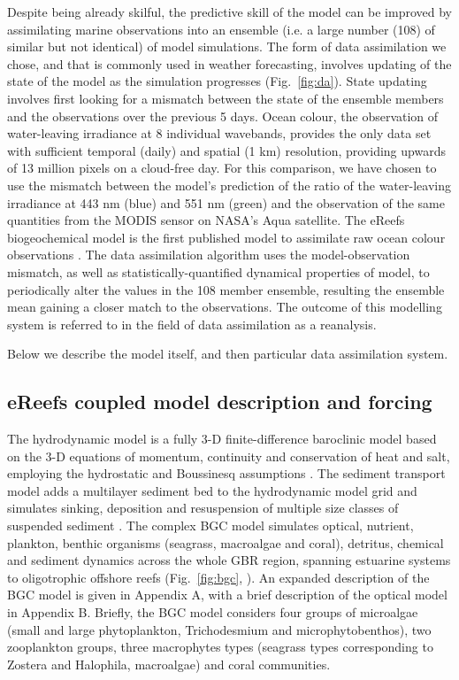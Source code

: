 \documentclass{elsart}
\begin{document}
Despite being already skilful, the predictive skill of the model can be improved by assimilating marine observations into an ensemble (i.e. a large number (108) of similar but not identical) of model simulations. The form of data assimilation we chose, and that is commonly used in weather forecasting, involves updating of the state of the model as the simulation progresses (Fig.~\ref{fig:da}). State updating involves first looking for a mismatch between the state of the ensemble members and the observations over the previous 5 days. Ocean colour, the observation of water-leaving irradiance at 8 individual wavebands, provides the only data set with sufficient temporal (daily) and spatial (1 km) resolution, providing upwards of 13 million pixels on a cloud-free day. For this comparison, we have chosen to use the mismatch between the model's prediction of the ratio of the water-leaving irradiance at 443 nm (blue) and 551 nm (green) and the observation of the same quantities from the MODIS sensor on NASA's Aqua satellite. The eReefs biogeochemical model is the first published model to assimilate raw ocean colour observations \citep{Jones16}. The data assimilation algorithm uses the model-observation mismatch, as well as statistically-quantified dynamical properties of model, to periodically alter the values in the 108 member ensemble, resulting the ensemble mean gaining a closer match to the observations. The outcome of this modelling system is referred to in the field of data assimilation as a reanalysis.

Below we describe the model itself, and then particular data assimilation system.  

\subsection{eReefs coupled model description and forcing}

The hydrodynamic model is a fully 3-D finite-difference baroclinic model based on the 3-D equations of momentum, continuity and conservation of heat and salt, employing the hydrostatic and Boussinesq assumptions \citep{Herzfeld06,Herzfeld15a}. The sediment transport model adds a multilayer sediment bed to the hydrodynamic model grid and simulates sinking, deposition and resuspension of multiple size classes of suspended sediment \citep{Margvelashvili09,Margvelashvili16}. The complex BGC model simulates optical, nutrient, plankton, benthic organisms (seagrass, macroalgae and coral), detritus, chemical and sediment dynamics across the whole GBR region, spanning estuarine systems to oligotrophic offshore reefs (Fig.~\ref{fig:bgc}, \citet{Baird16a}). An expanded description of the BGC model is given in Appendix A, with a brief description of the optical model in Appendix B. Briefly, the BGC model considers four groups of microalgae (small and large phytoplankton, Trichodesmium and microphytobenthos), two zooplankton groups, three macrophytes types (seagrass types corresponding to Zostera and Halophila, macroalgae) and coral communities.
\end{document}
